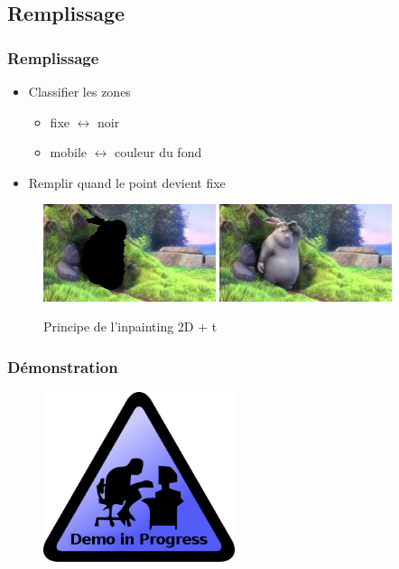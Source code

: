 \subsection{Remplissage}
\begin{frame}
  \frametitle{Remplissage}
  
  \begin{itemize}
  \item Classifier les zones
  	\begin{itemize}
  	\item fixe $\leftrightarrow$ noir
  	\item mobile $\leftrightarrow$ couleur du fond
  	\end{itemize}
  \item Remplir quand le point devient fixe  
  \end{itemize}

  \begin{figure}
  \includegraphics[width=0.45\textwidth]{Fig/bunny2-masked.png}
  \includegraphics[width=0.45\textwidth]{Fig/bunny1-original.png}
  \caption{Principe de l'inpainting 2D + t}
  \end{figure}
   
\end{frame}


 \begin{frame}
   \frametitle{Démonstration}
   \begin{figure}
   \includegraphics[width=0.5\textwidth]{Fig/demoInProgress.png}
   \end{figure}

 \end{frame}